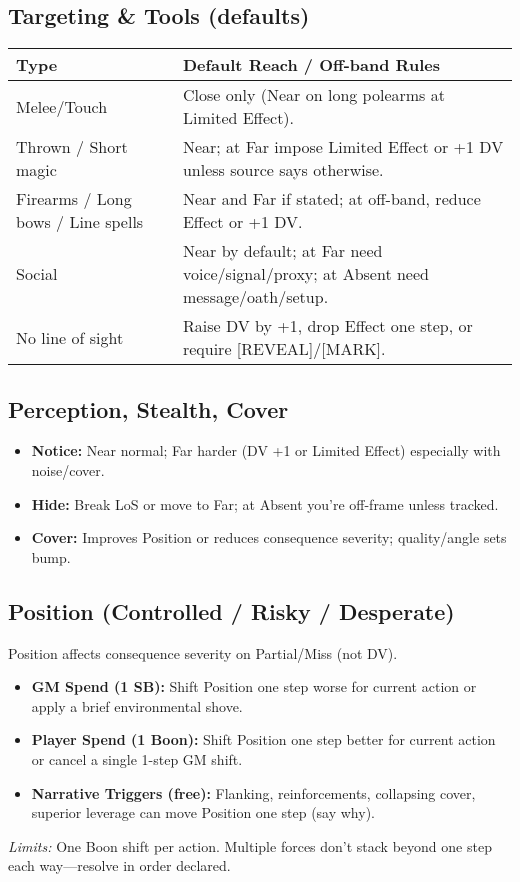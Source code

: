 \subsection{Targeting \& Tools (defaults)}
\begin{center}
\begin{tabular}{@{}lp{10.5cm}@{}}
\toprule
\textbf{Type} & \textbf{Default Reach / Off-band Rules} \\
\midrule
Melee/Touch & Close only (Near on long polearms at Limited Effect). \\
Thrown / Short magic & Near; at Far impose Limited Effect or +1 DV unless source says otherwise. \\
Firearms / Long bows / Line spells & Near and Far if stated; at off-band, reduce Effect or +1 DV. \\
Social & Near by default; at Far need voice/signal/proxy; at Absent need message/oath/setup. \\
No line of sight & Raise DV by +1, drop Effect one step, or require [REVEAL]/[MARK]. \\
\bottomrule
\end{tabular}
\end{center}

\subsection{Perception, Stealth, Cover}
\begin{itemize}
  \item \textbf{Notice:} Near normal; Far harder (DV +1 or Limited Effect) especially with noise/cover.
  \item \textbf{Hide:} Break LoS or move to Far; at Absent you're off-frame unless tracked.
  \item \textbf{Cover:} Improves Position or reduces consequence severity; quality/angle sets bump.
\end{itemize}

\subsection{Position (Controlled / Risky / Desperate)}
Position affects consequence severity on Partial/Miss (not DV).
\begin{itemize}
  \item \textbf{GM Spend (1 SB):} Shift Position one step worse for current action or apply a brief environmental shove.
  \item \textbf{Player Spend (1 Boon):} Shift Position one step better for current action or cancel a single 1-step GM shift.
  \item \textbf{Narrative Triggers (free):} Flanking, reinforcements, collapsing cover, superior leverage can move Position one step (say why).
\end{itemize}
\emph{Limits:} One Boon shift per action. Multiple forces don't stack beyond one step each way—resolve in order declared.

